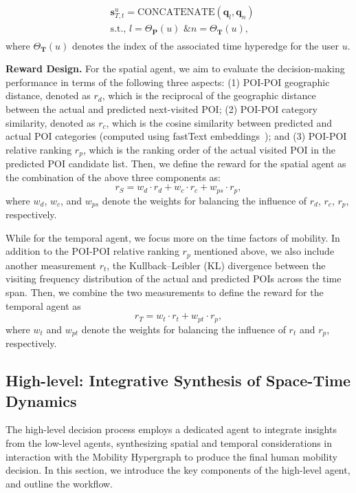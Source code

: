 \documentclass[letterpaper]{article} %
\begin{document}
\begin{align}
\begin{split}
    &\mathbf{s}^{u}_{T, t} = \text{CONCATENATE} (\mathbf{q}_l, \mathbf{q}_n) \\
    &\text{s.t., }l=\Theta_{\mathbf{P}}(u) \text{ \& }
 n=\Theta_{\mathbf{T}}(u), 
 \end{split}
\end{align}
where $\Theta_{\mathbf{T}}(u)$ denotes the index of the associated time hyperedge for the user $u$.


\noindent\textbf{Reward Design. } 
For the spatial agent, we aim to evaluate the decision-making performance in terms of the following three aspects: 
(1) POI-POI geographic distance, denoted as $ r_d $, which is the reciprocal of the geographic distance between the actual and predicted next-visited POI; 
(2) POI-POI category similarity, denoted as $ r_c $, which is the cosine similarity between predicted and actual POI categories (computed using fastText embeddings~\cite{bojanowski2017enriching}); and 
(3) POI-POI relative ranking $ r_p $, which is the ranking order of the actual visited POI in the predicted POI candidate list. 
Then, we define the reward for the spatial agent as the combination of the above three components as:
\begin{equation}
r_{S} = w_{d} \cdot r_{d} + w_{c} \cdot r_{c} + w_{ps} \cdot r_{p}, 
\end{equation}
where  $ w_{d} $, $ w_{c} $, and $ w_{ps} $ denote the weights for balancing the influence of $r_d$, $r_c$, $r_p$, respectively. 

While for the temporal agent, we focus more on the time factors of mobility. 
In addition to the POI-POI relative ranking $ r_p $ mentioned above, we also include another measurement $r_t$, the Kullback–Leibler (KL) divergence between the visiting frequency distribution of the actual and predicted POIs across the time span. 
Then, we combine the two measurements to define the reward for the temporal agent as
\begin{equation}
    r_{T} = w_{t} \cdot r_{t} + w_{pt} \cdot r_{p}, 
\end{equation}
where $w_{t}$ and $w_{pt}$ denote the weights for balancing the influence of $r_t$ and $r_p$, respectively.


\subsection{High-level: Integrative Synthesis of Space-Time Dynamics} 
The high-level decision process employs a dedicated agent to integrate insights from the low-level agents, synthesizing spatial and temporal considerations in interaction with the Mobility Hypergraph to produce the final human mobility decision. 
In this section, we introduce the key components of the high-level agent, and outline the workflow.
\end{document}
